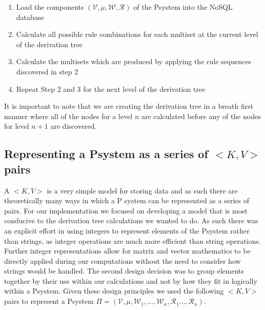 \documentclass[runningheads]{llncs}
\begin{document}
\begin{enumerate}
  \item Load the components $(\mathcal{V},\mu,\mathcal{W},\mathcal{R})$ of the Psystem into the NoSQL database 
  \item Calculate all possible rule combinations for each multiset at the current level of the derivation tree
  \item Calculate the multisets which are produced by applying the rule sequences discovered in step 2
  \item Repeat Step 2 and 3 for the next level of the derivation tree
\end{enumerate}

It is important to note that we are creating the derivation tree in a breath first manner where all of the nodes for a level $n$ are calculated before any of the nodes for level $n+1$ are discovered. 

\subsection{Representing a Psystem as a series of $<K,V>$ pairs}

A $<K,V>$ is a very simple model for storing data and as such there are theoretically many ways in which a P system can be represented as a series of pairs. For our implementation we focused on developing a model that is most conducive to the derivation tree calculations we wanted to do. As such there was an explicit effort in using integers to represent elements of the Psystem rather than strings, as integer operations are much more efficient than string operations. Further integer representations allow for matrix and vector mathematics to be directly applied during our computations without the need to consider how strings would be handled. The second design decision was to group elements together by their use within our calculations and not by how they fit in logically within a Psystem. Given these design principles we used the following $<K,V>$ pairs to represent a Psystem $\Pi=(\mathcal{V}, \mu, \mathcal{W}_1,\ldots  , \mathcal{W}_n, \mathcal{R}_1 \ldots  , \mathcal{R}_n)$.
\end{document}
